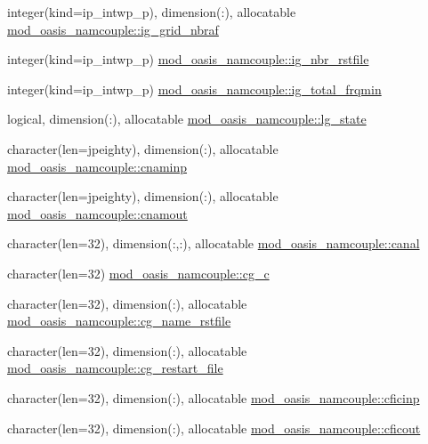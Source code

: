 \begin{DoxyCompactItemize}
\item 
integer(kind=ip\+\_\+intwp\+\_\+p), dimension(\+:), allocatable \hyperlink{namespacemod__oasis__namcouple_a8e8c38746c6c35b13d2d9b934835188c}{mod\+\_\+oasis\+\_\+namcouple\+::ig\+\_\+grid\+\_\+nbraf}
\item 
integer(kind=ip\+\_\+intwp\+\_\+p) \hyperlink{namespacemod__oasis__namcouple_a05148b30ca97c536b40a896153c8921f}{mod\+\_\+oasis\+\_\+namcouple\+::ig\+\_\+nbr\+\_\+rstfile}
\item 
integer(kind=ip\+\_\+intwp\+\_\+p) \hyperlink{namespacemod__oasis__namcouple_a839912711f8d2f44a825689e2673d0dd}{mod\+\_\+oasis\+\_\+namcouple\+::ig\+\_\+total\+\_\+frqmin}
\item 
logical, dimension(\+:), allocatable \hyperlink{namespacemod__oasis__namcouple_ac1be1629c1369b96a4ff08c07200a05d}{mod\+\_\+oasis\+\_\+namcouple\+::lg\+\_\+state}
\item 
character(len=jpeighty), dimension(\+:), allocatable \hyperlink{namespacemod__oasis__namcouple_a1f6ff08cee0c3c5deb262c1447d88328}{mod\+\_\+oasis\+\_\+namcouple\+::cnaminp}
\item 
character(len=jpeighty), dimension(\+:), allocatable \hyperlink{namespacemod__oasis__namcouple_a71ba84b9a7a813ca2551bcde99a0b5b5}{mod\+\_\+oasis\+\_\+namcouple\+::cnamout}
\item 
character(len=32), dimension(\+:,\+:), allocatable \hyperlink{namespacemod__oasis__namcouple_a796058b6973a31bc719877570886be1a}{mod\+\_\+oasis\+\_\+namcouple\+::canal}
\item 
character(len=32) \hyperlink{namespacemod__oasis__namcouple_aa219f127d0d00ba6ecd3972c4c4ed47f}{mod\+\_\+oasis\+\_\+namcouple\+::cg\+\_\+c}
\item 
character(len=32), dimension(\+:), allocatable \hyperlink{namespacemod__oasis__namcouple_ac79429a9522aabddbe4ed68fd9571bec}{mod\+\_\+oasis\+\_\+namcouple\+::cg\+\_\+name\+\_\+rstfile}
\item 
character(len=32), dimension(\+:), allocatable \hyperlink{namespacemod__oasis__namcouple_a6eec7fe795bfb9c2058c7953c072d442}{mod\+\_\+oasis\+\_\+namcouple\+::cg\+\_\+restart\+\_\+file}
\item 
character(len=32), dimension(\+:), allocatable \hyperlink{namespacemod__oasis__namcouple_af17e746f51dcf0110428ebe55f6d7285}{mod\+\_\+oasis\+\_\+namcouple\+::cficinp}
\item 
character(len=32), dimension(\+:), allocatable \hyperlink{namespacemod__oasis__namcouple_a6760c3952138ef35a5e2cd7b79238eaf}{mod\+\_\+oasis\+\_\+namcouple\+::cficout}

\end{DoxyCompactItemize}
